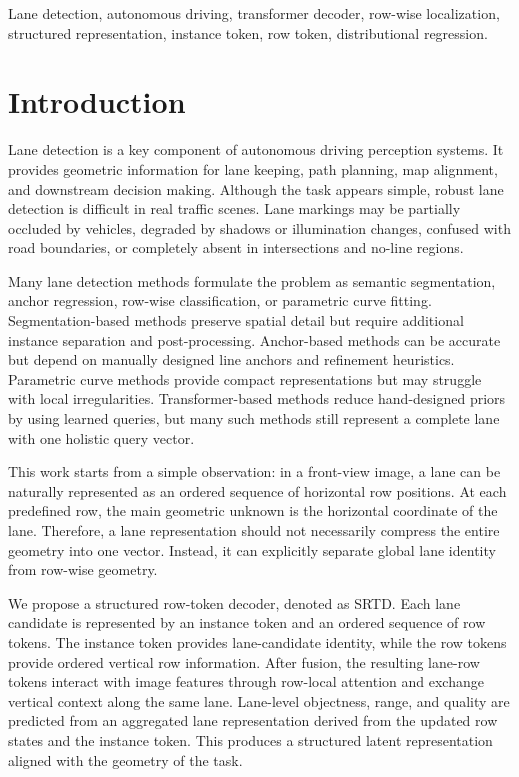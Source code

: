 \documentclass[conference]{IEEEtran}
\newcommand{\method}{SRTD}
\begin{document}
\begin{IEEEkeywords}
Lane detection, autonomous driving, transformer decoder, row-wise localization, structured representation, instance token, row token, distributional regression.
\end{IEEEkeywords}

\section{Introduction}

Lane detection is a key component of autonomous driving perception systems. It provides geometric information for lane keeping, path planning, map alignment, and downstream decision making. Although the task appears simple, robust lane detection is difficult in real traffic scenes. Lane markings may be partially occluded by vehicles, degraded by shadows or illumination changes, confused with road boundaries, or completely absent in intersections and no-line regions.

Many lane detection methods formulate the problem as semantic segmentation, anchor regression, row-wise classification, or parametric curve fitting. Segmentation-based methods preserve spatial detail but require additional instance separation and post-processing. Anchor-based methods can be accurate but depend on manually designed line anchors and refinement heuristics. Parametric curve methods provide compact representations but may struggle with local irregularities. Transformer-based methods reduce hand-designed priors by using learned queries, but many such methods still represent a complete lane with one holistic query vector.

This work starts from a simple observation: in a front-view image, a lane can be naturally represented as an ordered sequence of horizontal row positions. At each predefined row, the main geometric unknown is the horizontal coordinate of the lane. Therefore, a lane representation should not necessarily compress the entire geometry into one vector. Instead, it can explicitly separate global lane identity from row-wise geometry.

We propose a structured row-token decoder, denoted as \method. Each lane candidate is represented by an instance token and an ordered sequence of row tokens. The instance token provides lane-candidate identity, while the row tokens provide ordered vertical row information. After fusion, the resulting lane-row tokens interact with image features through row-local attention and exchange vertical context along the same lane. Lane-level objectness, range, and quality are predicted from an aggregated lane representation derived from the updated row states and the instance token. This produces a structured latent representation aligned with the geometry of the task.
\end{document}

